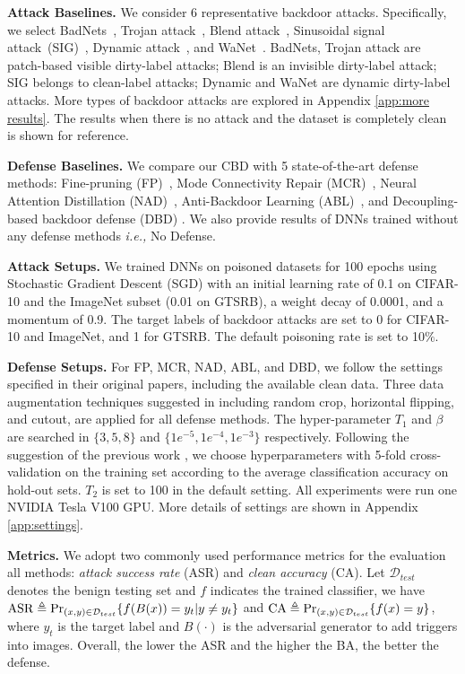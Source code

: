 \noindent\textbf{Attack Baselines.} 
We consider 6 representative backdoor attacks. Specifically, we select
BadNets~\cite{gu2017badnets}, Trojan attack~\cite{liu2018trojaning}, Blend attack~\cite{chen2017targeted}, Sinusoidal signal attack~(SIG)~\cite{barni2019new}, Dynamic attack~\cite{nguyen2020input}, and WaNet~\cite{nguyen2021wanet}.  BadNets, Trojan attack are patch-based visible dirty-label attacks; Blend is an invisible dirty-label attack; SIG belongs to clean-label attacks; Dynamic and WaNet are dynamic dirty-label attacks. More types of backdoor attacks are explored in Appendix \ref{app:more results}. The results when there is no attack and the dataset is completely clean is shown for reference.

\noindent\textbf{Defense Baselines.}
We compare our CBD with 5 state-of-the-art defense methods: Fine-pruning (FP)~\cite{liu2018fine}, Mode Connectivity Repair (MCR)~\cite{zhao2020bridging}, Neural Attention Distillation (NAD)~\cite{li2021neural}, Anti-Backdoor Learning (ABL)~\cite{li2021anti}, and Decoupling-based backdoor defense (DBD) \cite{backdoordecouple}. We also provide results of DNNs trained without any defense methods \emph{i.e.,} No Defense.

\noindent\textbf{Attack Setups.}
We trained DNNs on poisoned datasets for 100 epochs using Stochastic Gradient Descent (SGD) with an initial learning rate of 0.1 on CIFAR-10 and the ImageNet subset (0.01 on GTSRB), a weight decay of 0.0001, and a momentum of 0.9. The target labels of backdoor attacks are set to 0 for CIFAR-10 and ImageNet, and 1 for GTSRB. The default poisoning rate is set to 10$\%$.

\noindent\textbf{Defense Setups.}
For FP, MCR, NAD, ABL, and DBD, we follow the settings specified in their original papers, including the available clean data. 
Three data augmentation techniques suggested in \cite{li2021anti} including random crop, horizontal flipping, and cutout, are applied for all defense methods. The hyper-parameter $T_1$ and $\beta$ are searched in $\{3,5,8\}$ and $\{1e^{-5}, 1e^{-4}, 1e^{-3}\}$ respectively. Following the suggestion of the previous work \cite{zhao2020bridging}, we choose hyperparameters with 5-fold cross-validation on the training set according to the average classification accuracy on hold-out sets. $T_2$ is set to 100 in the default setting. 
All experiments were run one NVIDIA Tesla V100 GPU.
More details of settings are shown in Appendix \ref{app:settings}. 

\noindent\textbf{Metrics.} We adopt two commonly used performance metrics for the evaluation all methods: \emph{attack success rate} (ASR) and \emph{clean accuracy} (CA).
Let $\mathcal{D}_{test}$ denotes the benign testing set and $f$ indicates the trained classifier, we have ${\rm ASR} \triangleq \Pr_{({x},y) \in \mathcal{D}_{test}}\{f(B({x}))=y_t|y \neq y_t\}$ and ${\rm CA} \triangleq \Pr_{({x},y) \in \mathcal{D}_{test}}\{f({x})=y\}$, where $y_t$ is the target label and $B(\cdot)$ is the adversarial generator to add triggers into images. 
Overall, the lower the ASR and the higher the BA, the better the defense.


